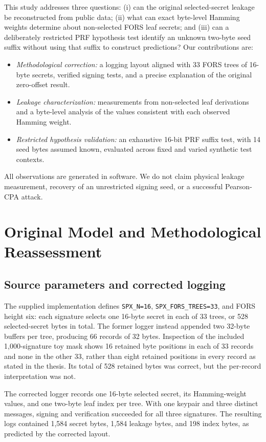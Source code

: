 \documentclass[conference,a4paper,10pt]{IEEEtran}
\begin{document}
This study addresses three questions: (i) can the original selected-secret leakage be reconstructed from public data; (ii) what can exact byte-level Hamming weights determine about non-selected FORS leaf secrets; and (iii) can a deliberately restricted PRF hypothesis test identify an unknown two-byte seed suffix without using that suffix to construct predictions? Our contributions are:
\begin{itemize}
\item \emph{Methodological correction:} a logging layout aligned with 33 FORS trees of 16-byte secrets, verified signing tests, and a precise explanation of the original zero-offset result.
\item \emph{Leakage characterization:} measurements from non-selected leaf derivations and a byte-level analysis of the values consistent with each observed Hamming weight.
\item \emph{Restricted hypothesis validation:} an exhaustive 16-bit PRF suffix test, with 14 seed bytes assumed known, evaluated across fixed and varied synthetic test contexts.
\end{itemize}
All observations are generated in software. We do not claim physical leakage measurement, recovery of an unrestricted signing seed, or a successful Pearson-CPA attack.

\section{Original Model and Methodological Reassessment}
\subsection{Source parameters and corrected logging}
The supplied implementation defines \texttt{SPX\_N=16}, \texttt{SPX\_FORS\_TREES=33}, and FORS height six: each signature selects one 16-byte secret in each of 33 trees, or 528 selected-secret bytes in total. The former logger instead appended two 32-byte buffers per tree, producing 66 records of 32 bytes. Inspection of the included 1,000-signature toy mask shows 16 retained byte positions in each of 33 records and none in the other 33, rather than eight retained positions in every record as stated in the thesis. Its total of 528 retained bytes was correct, but the per-record interpretation was not.

The corrected logger records one 16-byte selected secret, its Hamming-weight values, and one two-byte leaf index per tree. With one keypair and three distinct messages, signing and verification succeeded for all three signatures. The resulting logs contained 1,584 secret bytes, 1,584 leakage bytes, and 198 index bytes, as predicted by the corrected layout.
\end{document}
